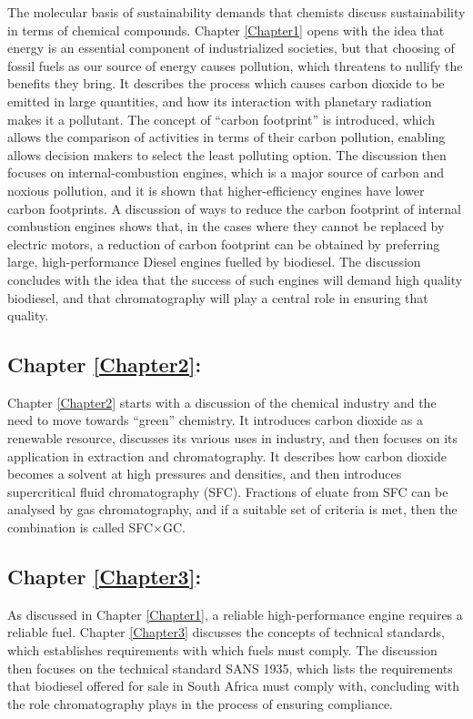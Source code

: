 The molecular basis of sustainability \autocite{Anastas2016} demands that
chemists discuss sustainability in terms of chemical compounds. Chapter
\ref{Chapter1} opens with the idea that energy is an essential component of
industrialized societies, but that choosing of fossil fuels as our source of
energy causes pollution, which threatens to nullify the benefits they bring. It
describes the process which causes carbon dioxide to be emitted in large
quantities, and how its interaction with planetary radiation makes it a
pollutant. The concept of ``carbon footprint'' is introduced, which allows the
comparison of activities in terms of their carbon pollution, enabling allows
decision makers to select the least polluting option. The discussion then
focuses on internal-combustion engines, which is a major source of carbon and
noxious pollution, and it is shown that higher-efficiency engines have lower
carbon footprints. A discussion of ways to reduce the carbon footprint of
internal combustion engines shows that, in the cases where they cannot be
replaced by electric motors, a reduction of carbon footprint can be obtained by
preferring large, high-performance Diesel engines fuelled by biodiesel. The
discussion concludes with the idea that the success of such engines will demand
high quality biodiesel, and that chromatography will play a central role in
ensuring that quality.

\subsection{Chapter \ref{Chapter2}:  }

Chapter \ref{Chapter2} starts with a discussion of the chemical industry and the
need to move towards ``green'' chemistry. It introduces carbon dioxide as a
renewable resource, discusses its various uses in industry, and then focuses on
its application in extraction and chromatography. It describes how carbon
dioxide becomes a solvent at high pressures and densities, and then introduces
supercritical fluid chromatography (SFC). Fractions of eluate from SFC can be
analysed by gas chromatography, and if a suitable set of criteria is met, then
the combination is called SFC×GC.

\subsection{Chapter \ref{Chapter3}:  }

As discussed in Chapter \ref{Chapter1}, a reliable high-performance engine
requires a reliable fuel. Chapter \ref{Chapter3} discusses the concepts of
technical standards, which establishes requirements with which fuels must
comply. The discussion then focuses on the technical standard SANS 1935, which
lists the requirements that biodiesel offered for sale in South Africa must
comply with, concluding with the role chromatography plays in the process of
ensuring compliance.


